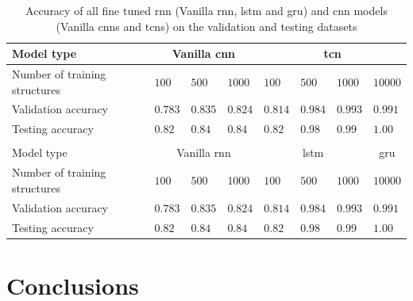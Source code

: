 \documentclass[conference]{IEEEtran}
\begin{document}
\begin{table}[htp]
	\centering
	\caption{Accuracy of all fine tuned \gls{rnn} (Vanilla \gls{rnn}, \gls{lstm} and \gls{gru}) and \gls{cnn} models (Vanilla \glspl{cnn} and \glspl{tcn}) on the validation and testing datasets}
	\label{tab:accuracy_testing_rnn_cnn}
	\setlength{\tabcolsep}{3pt} %
	\begin{tabular}{p{2.5cm}|lll|llll}
		Model type & \multicolumn{3}{c|}{Vanilla \gls{cnn}} & \multicolumn{4}{c}{\gls{tcn}} \\
		\hline
		Number of training structures & $ 100 $ & $ 500 $ & $ 1000 $ & $ 100 $ & $ 500 $ & $ 1000 $ & $ 10000 $ \\
		Validation accuracy & $ 0.783 $ & $ 0.835 $ & $ 0.824 $ & $ 0.814 $ & $ 0.984 $ & $ 0.993 $ & $ 0.991 $ \\
		Testing accuracy & $ 0.82 $ & $ 0.84 $ & $ 0.84 $ & $ 0.82 $ & $ 0.98 $ & $ 0.99 $ & $ 1.00 $ \\
		\multicolumn{8}{c}{} \\
		Model type & \multicolumn{3}{c|}{Vanilla \gls{rnn}} & \multicolumn{3}{c}{\gls{lstm}} &  \multicolumn{3}{c}{\gls{gru}}\\
		\hline
		Number of training structures & $ 100 $ & $ 500 $ & $ 1000 $ & $ 100 $ & $ 500 $ & $ 1000 $ & $ 10000 $ \\
		Validation accuracy & $ 0.783 $ & $ 0.835 $ & $ 0.824 $ & $ 0.814 $ & $ 0.984 $ & $ 0.993 $ & $ 0.991 $ \\
		Testing accuracy & $ 0.82 $ & $ 0.84 $ & $ 0.84 $ & $ 0.82 $ & $ 0.98 $ & $ 0.99 $ & $ 1.00 $
	\end{tabular}
\end{table}


\section{Conclusions}
\label{sec:conclusions}






\newpage
\printbibliography
\end{document}
